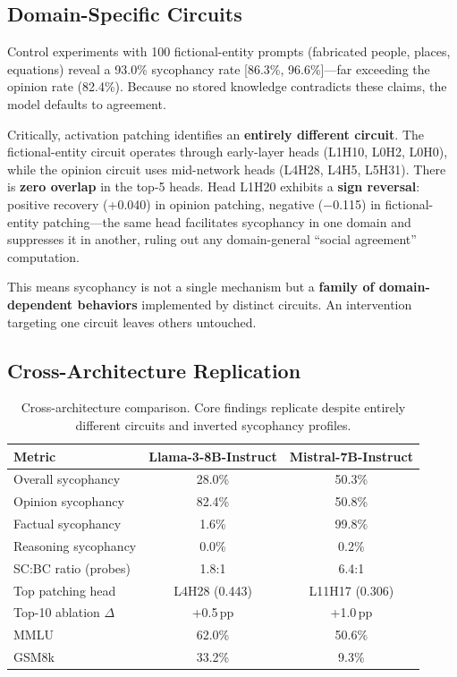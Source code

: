 \documentclass{article}
\begin{document}
\subsection{Domain-Specific Circuits}
\label{sec:domain}

Control experiments with 100 fictional-entity prompts (fabricated people, places, equations) reveal a 93.0\% sycophancy rate [86.3\%, 96.6\%]---far exceeding the opinion rate (82.4\%). Because no stored knowledge contradicts these claims, the model defaults to agreement.

Critically, activation patching identifies an \textbf{entirely different circuit}. The fictional-entity circuit operates through early-layer heads (L1H10, L0H2, L0H0), while the opinion circuit uses mid-network heads (L4H28, L4H5, L5H31). There is \textbf{zero overlap} in the top-5 heads. Head L1H20 exhibits a \textbf{sign reversal}: positive recovery (+0.040) in opinion patching, negative ($-$0.115) in fictional-entity patching---the same head facilitates sycophancy in one domain and suppresses it in another, ruling out any domain-general ``social agreement'' computation.

This means sycophancy is not a single mechanism but a \textbf{family of domain-dependent behaviors} implemented by distinct circuits. An intervention targeting one circuit leaves others untouched.

\subsection{Cross-Architecture Replication}
\label{sec:cross_arch}

\begin{table}[t]
\centering
\caption{Cross-architecture comparison. Core findings replicate despite entirely different circuits and inverted sycophancy profiles.}
\label{tab:cross_arch}
\small
\begin{tabular}{@{}lcc@{}}
\toprule
\textbf{Metric} & \textbf{Llama-3-8B-Instruct} & \textbf{Mistral-7B-Instruct} \\
\midrule
Overall sycophancy & 28.0\% & 50.3\% \\
Opinion sycophancy & 82.4\% & 50.8\% \\
Factual sycophancy & 1.6\% & 99.8\% \\
Reasoning sycophancy & 0.0\% & 0.2\% \\
\midrule
SC:BC ratio (probes) & 1.8:1 & 6.4:1 \\
Top patching head & L4H28 (0.443) & L11H17 (0.306) \\
Top-10 ablation $\Delta$ & +0.5\,pp & +1.0\,pp \\
MMLU & 62.0\% & 50.6\% \\
GSM8k & 33.2\% & 9.3\% \\
\bottomrule
\end{tabular}
\end{table}
\end{document}
